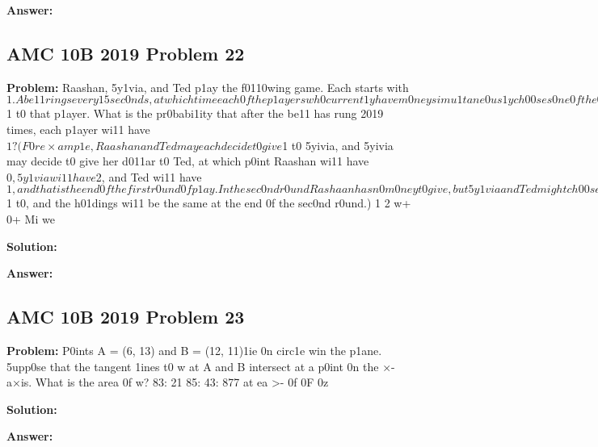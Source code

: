 \documentclass{article}
\newenvironment{problem}{\textbf{Problem: }}{\\[0.5em]}
\newenvironment{solution}{\textbf{Solution: }}{\\[0.5em]}
\newenvironment{answer}{\textbf{Answer: }}{\\[0.5em]}
\begin{document}
\begin{answer}
\end{answer}

\subsection{AMC 10B 2019 Problem 22}

\begin{problem}
Raashan, 5y1via, and Ted p1ay the f0110wing game. Each starts with $1. A be11 rings every 15 sec0nds, at which time each 0f the p1ayers wh0 current1y have m0ney simu1tane0us1y ch00ses 0ne 0f the 0ther tw0 p1ayers independent1y and at rand0m and gives $1 t0 that p1ayer. What is the pr0babi1ity that after the be11 has rung 2019 times, each p1ayer wi11 have $1? (F0r e×amp1e, Raashan and Ted may each decide t0 give $1 t0 5yivia, and 5yivia may decide t0 give her d011ar t0 Ted, at which p0int Raashan wi11 have $0, 5y1via wi11 have $2, and Ted wi11 have $1, and that is the end 0f the first r0und 0f p1ay. In the sec0nd r0und Rashaan has n0 m0ney t0 give, but 5y1via and Ted might ch00se each 0ther t0 give their $1 t0, and the h01dings wi11 be the same at the end 0f the sec0nd r0und.) 1 2 w+ 0+ Mi we
\end{problem}

\begin{solution}
\end{solution}

\begin{answer}
\end{answer}

\subsection{AMC 10B 2019 Problem 23}

\begin{problem}
P0ints A = (6, 13) and B = (12, 11)1ie 0n circ1e win the p1ane. 5upp0se that the tangent 1ines t0 w at A and B intersect at a p0int 0n the ×- a×is. What is the area 0f w? 83: 21 85: 43: 877 at ea >- 0f 0F 0z
\end{problem}

\begin{solution}
\end{solution}

\begin{answer}
\end{answer}
\end{document}
